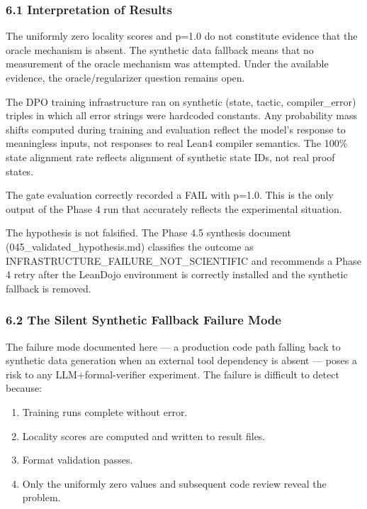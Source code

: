 
\subsubsection{6.1 Interpretation of Results}

The uniformly zero locality scores and p=1.0 do not constitute evidence that the oracle mechanism is absent. The synthetic data fallback means that no measurement of the oracle mechanism was attempted. Under the available evidence, the oracle/regularizer question remains open.

The DPO training infrastructure ran on synthetic (state, tactic, compiler_error) triples in which all error strings were hardcoded constants. Any probability mass shifts computed during training and evaluation reflect the model's response to meaningless inputs, not responses to real Lean4 compiler semantics. The 100\% state alignment rate reflects alignment of synthetic state IDs, not real proof states.

The gate evaluation correctly recorded a FAIL with p=1.0. This is the only output of the Phase 4 run that accurately reflects the experimental situation.

The hypothesis is not falsified. The Phase 4.5 synthesis document (045_validated_hypothesis.md) classifies the outcome as INFRASTRUCTURE_FAILURE_NOT_SCIENTIFIC and recommends a Phase 4 retry after the LeanDojo environment is correctly installed and the synthetic fallback is removed.

\subsubsection{6.2 The Silent Synthetic Fallback Failure Mode}

The failure mode documented here — a production code path falling back to synthetic data generation when an external tool dependency is absent — poses a risk to any LLM+formal-verifier experiment. The failure is difficult to detect because:

\begin{enumerate}
\item Training runs complete without error.
\item Locality scores are computed and written to result files.
\item Format validation passes.
\item Only the uniformly zero values and subsequent code review reveal the problem.
\end{enumerate}

